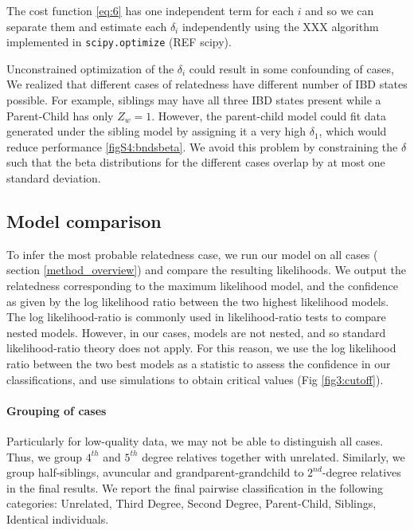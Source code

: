 \documentclass[12pt, letterpaper]{article}
\begin{document}
The cost function \ref{eq:6} has one independent term for each $i$ and so we can separate them and estimate each $\delta_i$ independently using the XXX algorithm implemented in \texttt{scipy.optimize} (REF scipy). 


Unconstrained optimization of the $\delta_i$ could result in some confounding of cases, We realized that different cases of relatedness have different number of IBD states possible. For example, siblings may have all three IBD states present while a Parent-Child has only $Z_w=1$. However, the parent-child model could fit data generated under the sibling model by assigning it a very high $\delta_1$, which would reduce performance  \ref{figS4:bndsbeta}. We avoid this problem by constraining the $\delta$ such that the beta distributions for the different cases overlap by at most one standard deviation.

\subsection{Model comparison}\label{model_comp}
To infer the most probable relatedness case, we run our model on all cases ( section \ref{method_overview}) and compare the resulting likelihoods. We output the relatedness corresponding to the maximum likelihood model, and the confidence as given by the log likelihood ratio between the two highest likelihood models. The log likelihood-ratio is commonly used in likelihood-ratio tests to compare nested models. However, in our cases, models are not nested, and so standard likelihood-ratio theory does not apply. For this reason, we use the log likelihood ratio between the two best models as a statistic to assess the confidence in our classifications, and use simulations to obtain critical values (Fig \ref{fig3:cutoff}). 

\paragraph{Grouping of cases}
Particularly for low-quality data, we may not be able to distinguish all cases. Thus, we group $4^{th}$ and $5^{th}$ degree relatives together with unrelated.  Similarly, we group  half-siblings, avuncular and grandparent-grandchild to  $2^{nd}$-degree relatives in the final results. We report the final pairwise classification in the following categories: Unrelated, Third Degree, Second Degree, Parent-Child, Siblings, Identical individuals.
\end{document}
